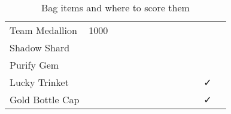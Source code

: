 \documentclass[ebook,10pt,openany,oneside]{memoir}
\begin{document}
\begin{table}
\begin{tabular}{p{}cccccccccccc}
Team Medallion    & 1000 &   &     &    &    &     &     &     &   &   &   &   \\
Shadow Shard      &      &   &     &    &    &     &     &     &   &   &   &   \\
Purify Gem        &      &   &     &    &    &     &     &     &   &   &   &   \\
Lucky Trinket     &      &   &     &    &    &     &     &     &   &   & ✓ &   \\
Gold Bottle Cap   &      &   &     &    &    &     &     &     &   &   & ✓ &   \\
\end{tabular}
\caption{Bag items and where to score them\label{table:items}}
\end{table}
\end{document}
